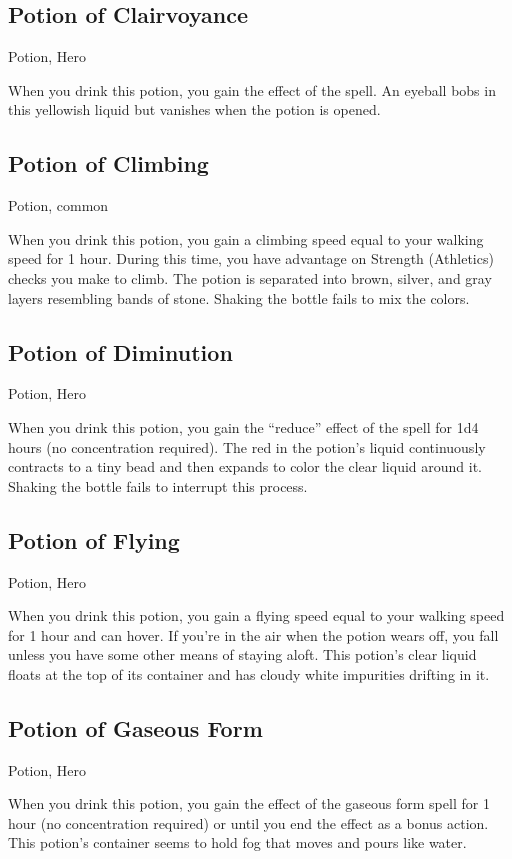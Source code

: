 \subsection{Potion of Clairvoyance}
Potion, Hero

When you drink this potion, you gain the effect of the  spell. An eyeball bobs in this yellowish liquid but vanishes when the potion is opened.

\subsection{Potion of Climbing}
Potion, common

When you drink this potion, you gain a climbing speed equal to your walking speed for 1 hour. During this time, you have advantage on Strength (Athletics) checks you make to climb. The potion is separated into brown, silver, and gray layers resembling bands of stone. Shaking the bottle fails to mix the colors.

\subsection{Potion of Diminution}
Potion, Hero

When you drink this potion, you gain the “reduce” effect of the
 spell for 1d4 hours (no concentration required). The red in the potion's liquid continuously contracts to a tiny bead and then expands to color the clear liquid around it. Shaking the bottle fails to interrupt this process.

\subsection{Potion of Flying}
Potion, Hero 

When you drink this potion, you gain a flying speed equal to your walking speed for 1 hour and can hover. If you're in the air when the potion wears off, you fall unless you have some other means of staying aloft. This potion's clear liquid floats at the top of its container and has cloudy white impurities drifting in it.

\subsection{Potion of Gaseous Form}
Potion, Hero 

When you drink this potion, you gain the effect of the gaseous form spell for 1 hour (no concentration required) or until you end the effect as a bonus action. This potion's container seems to hold fog that moves and pours like water.

